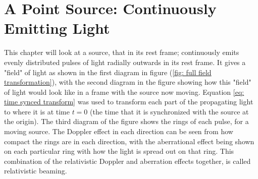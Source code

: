 

\printbibliography[segment=\therefsegment, heading=subbibliography]

\chapter{A Point Source: Continuously Emitting Light} \label{ch: A Point Source Continually Emitting Light} %

This chapter will look at a source, that in its rest frame; continuously emits evenly distributed pulses of light radially outwards in its rest frame.
It gives a "field" of light as shown in the first diagram in figure (\ref{fig: full field transformation}), with the second diagram in the figure showing how this "field" of light would look like in a frame with the source now moving.
Equation \eqref{eq: time synced transform} was used to transform each part of the propagating light to where it is at time $t=0$ (the time that it is synchronized with the source at the origin).
The third diagram of the figure shows the rings of each pulse, for a moving source.
The Doppler effect in each direction can be seen from how compact the rings are in each direction, with the aberrational effect being shown on each particular ring with how the light is spread out on that ring.
This combination of the relativistic Doppler and aberration effects together, is called relativistic beaming.


